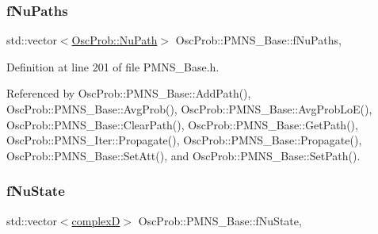 \mbox{\label{classOscProb_1_1PMNS__Base_a69db9d57e12fc7cbe0431bc6c18fac93}} 
\subsubsection{\texorpdfstring{f\+Nu\+Paths}{fNuPaths}}
{\footnotesize\ttfamily std\+::vector$<$\hyperlink{structOscProb_1_1NuPath}{Osc\+Prob\+::\+Nu\+Path}$>$ Osc\+Prob\+::\+P\+M\+N\+S\+\_\+\+Base\+::f\+Nu\+Paths\hspace{0.3cm}{\ttfamily [protected]}, {\ttfamily [inherited]}}



Definition at line 201 of file P\+M\+N\+S\+\_\+\+Base.\+h.



Referenced by Osc\+Prob\+::\+P\+M\+N\+S\+\_\+\+Base\+::\+Add\+Path(), Osc\+Prob\+::\+P\+M\+N\+S\+\_\+\+Base\+::\+Avg\+Prob(), Osc\+Prob\+::\+P\+M\+N\+S\+\_\+\+Base\+::\+Avg\+Prob\+Lo\+E(), Osc\+Prob\+::\+P\+M\+N\+S\+\_\+\+Base\+::\+Clear\+Path(), Osc\+Prob\+::\+P\+M\+N\+S\+\_\+\+Base\+::\+Get\+Path(), Osc\+Prob\+::\+P\+M\+N\+S\+\_\+\+Iter\+::\+Propagate(), Osc\+Prob\+::\+P\+M\+N\+S\+\_\+\+Base\+::\+Propagate(), Osc\+Prob\+::\+P\+M\+N\+S\+\_\+\+Base\+::\+Set\+Att(), and Osc\+Prob\+::\+P\+M\+N\+S\+\_\+\+Base\+::\+Set\+Path().

\mbox{\label{classOscProb_1_1PMNS__Base_abf99f2339e3ee989600740b5d88063e8}} 
\subsubsection{\texorpdfstring{f\+Nu\+State}{fNuState}}
{\footnotesize\ttfamily std\+::vector$<$\hyperlink{EigenPoint_8h_a67ca8e107e20610c3fff78d5e726ece0}{complexD}$>$ Osc\+Prob\+::\+P\+M\+N\+S\+\_\+\+Base\+::f\+Nu\+State\hspace{0.3cm}{\ttfamily [protected]}, {\ttfamily [inherited]}}



